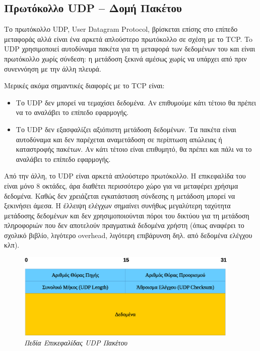 %
%
\subsection{Πρωτόκολλο UDP -- Δομή Πακέτου}

Το πρωτόκολλο UDP, User Datagram Protocol, βρίσκεται επίσης στο επίπεδο μεταφοράς αλλά είναι ένα αρκετά απλούστερο πρωτόκολλο σε σχέση με το TCP. To UDP χρησιμοποιεί αυτοδύναμα πακέτα για τη μεταφορά των δεδομένων του και είναι πρωτόκολλο χωρίς σύνδεση: η μετάδοση ξεκινά αμέσως χωρίς να υπάρχει από πριν συνεννόηση με την άλλη πλευρά. 

Μερικές ακόμα σημαντικές διαφορές με το TCP είναι:

\begin{itemize}
\item Το UDP δεν μπορεί να τεμαχίσει δεδομένα. Αν επιθυμούμε κάτι τέτοιο θα πρέπει να το αναλάβει το επίπεδο εφαρμογής.
\item Το UDP δεν εξασφαλίζει αξιόπιστη μετάδοση δεδομένων. Τα πακέτα είναι αυτοδύναμα και δεν παρέχεται αναμετάδοση σε περίπτωση απώλειας ή καταστροφής πακέτων. Αν κάτι τέτοιο είναι επιθυμητό, θα πρέπει και πάλι να το αναλάβει το επίπεδο εφαρμογής.
\end{itemize}

Από την άλλη, το UDP είναι αρκετά απλούστερο πρωτόκολλο. Η επικεφαλίδα του είναι μόνο 8 οκτάδες, άρα διαθέτει περισσότερο χώρο για να μεταφέρει χρήσιμα δεδομένα. Καθώς δεν χρειάζεται εγκατάσταση σύνδεσης η μετάδοση μπορεί να ξεκινήσει άμεσα. Η έλλειψη ελέγχων σημαίνει συνήθως μεγαλύτερη ταχύτητα μετάδοσης δεδομένων και δεν χρησιμοποιούνται πόροι του δικτύου για τη μετάδοση πληροφοριών που δεν αποτελούν πραγματικά δεδομένα χρήστη (όπως αναφέρει το σχολικό βιβλίο, λιγότερο overhead, λιγότερη επιβάρυνση δηλ. από δεδομένα ελέγχου κλπ).

\begin{figure}[!ht]
 \centering
 \includegraphics[width=0.95\textwidth]{images/chapter4/4-4}
 \caption {\textsl{Πεδία Επικεφαλίδας UDP Πακέτου}}
 \label{4-4}
\end{figure}

